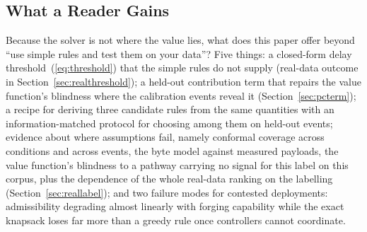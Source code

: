 \documentclass[conference,a4paper]{IEEEtran}
\newif\ifsubmission
\begin{document}
\ifsubmission
\subsection{What a Reader Gains}
Because the solver is not where the value lies, what does this paper offer beyond ``use simple rules and test them on your data''? Five things: a closed-form delay threshold~(\ref{eq:threshold}) that the simple rules do not supply (real-data outcome in Section~\ref{sec:realthreshold}); a held-out contribution term that repairs the value function's blindness where the calibration events reveal it (Section~\ref{sec:pcterm}); a recipe for deriving three candidate rules
from the same quantities with an information-matched protocol for choosing among them on
held-out events; evidence about where assumptions fail, namely conformal coverage across
conditions and across events, the byte model against measured payloads, the value
function's blindness to a pathway carrying no signal for this label on this corpus, plus the dependence
of the whole real-data ranking on the labelling (Section~\ref{sec:reallabel}); and two failure
modes for contested deployments: admissibility degrading almost linearly with forging capability
while the exact knapsack loses far more than a greedy rule once controllers cannot
coordinate.

\else
\end{document}
